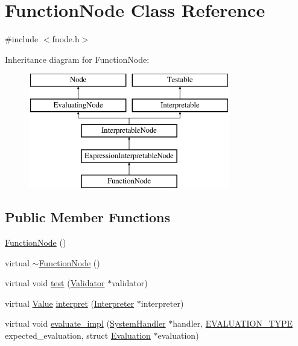 \hypertarget{classFunctionNode}{}\section{Function\+Node Class Reference}
\label{classFunctionNode}


{\ttfamily \#include $<$fnode.\+h$>$}

Inheritance diagram for Function\+Node\+:\begin{figure}[H]
\begin{center}
\leavevmode
\includegraphics[height=5.000000cm]{classFunctionNode}
\end{center}
\end{figure}
\subsection*{Public Member Functions}
\begin{DoxyCompactItemize}
\item 
\hyperlink{classFunctionNode_ac4467a4c13382e0058cb2bd4fb70e0ab}{Function\+Node} ()
\item 
virtual \hyperlink{classFunctionNode_ad9c4a35db175de9386ac86d91a1a95df}{$\sim$\+Function\+Node} ()
\item 
virtual void \hyperlink{classFunctionNode_a1f020e7ea0181b3ce16ad2ef8426f773}{test} (\hyperlink{classValidator}{Validator} $\ast$validator)
\item 
virtual \hyperlink{classValue}{Value} \hyperlink{classFunctionNode_a059e6682cd51d0e126372a7af257ea5a}{interpret} (\hyperlink{classInterpreter}{Interpreter} $\ast$interpreter)
\item 
virtual void \hyperlink{classFunctionNode_a697f1fdc368f5ad09284b32b4466f353}{evaluate\+\_\+impl} (\hyperlink{classSystemHandler}{System\+Handler} $\ast$handler, \hyperlink{statics_8h_a6664c451ca7787483a7981cc1de68dbb}{E\+V\+A\+L\+U\+A\+T\+I\+O\+N\+\_\+\+T\+Y\+PE} expected\+\_\+evaluation, struct \hyperlink{structEvaluation}{Evaluation} $\ast$evaluation)
\end{DoxyCompactItemize}
